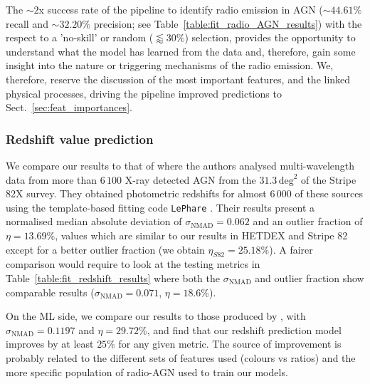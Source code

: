 \documentclass{aa}
\begin{document}
The ${\sim} 2$x success rate of the pipeline to identify radio emission in AGN (${\sim} 44.61\%$ recall and ${\sim} 32.20\%$ precision; see Table~\ref{table:fit_radio_AGN_results}) with the respect to a 'no-skill' or random (${\lessapprox}30 \%$) selection, provides the opportunity to understand what the model has learned from the data and, therefore, gain some insight into the nature or triggering mechanisms of the radio emission. We, therefore, reserve the discussion of the most important features, and the linked physical processes, driving the pipeline improved predictions to Sect.~\ref{sec:feat_importances}.


\subsubsection{Redshift value prediction}\label{sec:previous_z_values}

We compare our results to that of \citet[][Stripe 82X]{2017ApJ...850...66A} where the authors analysed multi-wavelength data from more than $6\,100$ X-ray detected AGN from the $31.3\, \mathrm{deg}^{2}$ of the Stripe 82X survey. They obtained photometric redshifts for almost $6\,000$ of these sources using the template-based fitting code \verb|LePhare| \citep{1999MNRAS.310..540A, 2006A&A...457..841I}. Their results present a normalised median absolute deviation of $\sigma_{\mathrm{NMAD}} = 0.062$ and an outlier fraction of $\eta = 13.69 \%$, values which are similar to our results in HETDEX and Stripe 82 except for a better outlier fraction (we obtain $\eta_{S82}=25.18\%$). A fairer comparison would require to look at the testing metrics in Table~\ref{table:fit_redshift_results} where both the $\sigma_{\mathrm{NMAD}}$ and outlier fraction show comparable results ($\sigma_{\mathrm{NMAD}} = 0.071$, $\eta = 18.6$\%).

On the ML side, we compare our results to those produced by \citet{2021Galax...9...86C}, with $\sigma_{\mathrm{NMAD}} = 0.1197$ and $\eta = 29.72 \%$, and find that our redshift prediction model improves by at least $25 \%$ for any given metric.
The source of improvement is probably related to the different sets of features used (colours vs ratios) and the more specific population of radio-AGN used to train our models.
\end{document}
